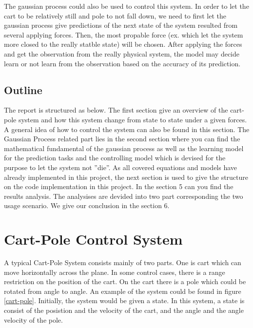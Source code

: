 \documentclass[11pt,twoside,a4paper]{article}
\begin{document}
The gaussian process could also be used to control this system. In
order to let the cart to be relatively still and pole to not fall down, we need
to first let the gaussian process give predictions of the next state
of the system resulted from several applying forces. Then, the most
propable force (ex. which let the system more closed to the really
statble state) will be chosen. After applying the forces and get the observation from
the really physical system, the model may decide learn or not learn from the observation
 based on the accuracy of its prediction.\\

\subsection{Outline}

The report is structured as below. The first section give an overview
of the cart-pole system and how this system change from state to state
under a given forces. A general idea of how to control the system can also be found in this section.
The Gaussian Process related part lies in the
second section where you can find the mathematical fundamental of the
gaussian process as well as the learning model for the prediction
tasks and the controlling model which is devised for the purpose to
let the system not ''die''. As all covered equations and models have already implemented in this project,
the next section is used to give the structure on the code
implementation in this project. In the section 5 can you find
the results analysis. The analysises are devided into two part
corresponding the two usage scenario. We give our conclusion in the
section 6.\\ 

\section{Cart-Pole Control System}
A typical Cart-Pole System consists mainly of two parts. One is cart
which can move horizontally across the plane. In some control cases,
there is a range restriction on the position of the cart. On the cart
there is a pole which could be rotated from angle to angle. An example
of the system could be found in figure \ref{cart-pole}. Initially,
the system would be given a state. In this system, a state is consist
of the posistion and the velocity of the cart, and the angle and the
angle velocity of the pole.\\
\end{document}
